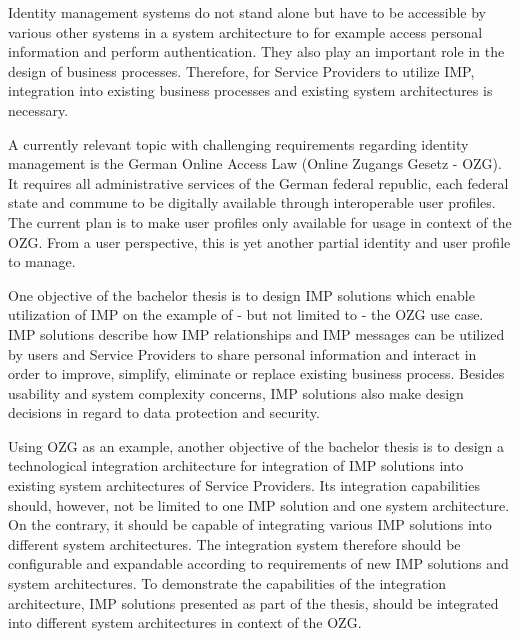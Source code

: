 Identity management systems do not stand alone but have to be accessible by various other systems in a system architecture to for example access personal information and perform authentication. They also play an important role in the design of business processes. Therefore, for Service Providers to utilize IMP, integration into existing business processes and existing system architectures is necessary. 

A currently relevant topic with challenging requirements regarding identity management is the German Online Access Law (Online Zugangs Gesetz - OZG). It requires all administrative services of the German federal republic, each federal state and commune to be digitally available through interoperable user profiles. The current plan is to make user profiles only available for usage in context of the OZG. From a user perspective, this is yet another partial identity and user profile to manage.

One objective of the bachelor thesis is to design IMP solutions which enable utilization of IMP on the example of - but not limited to - the OZG use case. IMP solutions describe how IMP relationships and IMP messages can be utilized by users and Service Providers to share personal information and interact in order to improve, simplify, eliminate or replace existing business process. Besides usability and system complexity concerns, IMP solutions also make design decisions in regard to data protection and security.

Using OZG as an example, another objective of the bachelor thesis is to design a technological integration architecture for integration of IMP solutions into existing system architectures of Service Providers. Its integration capabilities should, however, not be limited to one IMP solution and one system architecture. On the contrary, it should be capable of integrating various IMP solutions into different system architectures. The integration system therefore should be configurable and expandable according to requirements of new IMP solutions and system architectures. To demonstrate the capabilities of the integration architecture, IMP solutions presented as part of the thesis, should be integrated into different system architectures in context of the OZG.